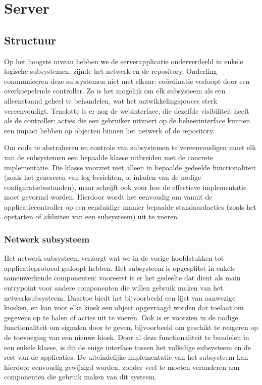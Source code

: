 \part{Server}
\label{server}

\chapter{Structuur}

Op het hoogste niveau hebben we de serverapplicatie onderverdeeld in enkele logische subsystemen, zijnde het netwerk en de repository. Onderling communiceren deze subsystemen niet met elkaar: coördinatie verloopt door een overkoepelende controller. Zo is het mogelijk om elk subsysteem als een alleenstaand geheel te behandelen, wat het ontwikkelingsproces sterk vereenvoudigt. Tenslotte is er nog de webinterface, die dezelfde visibiliteit heeft als de controller: acties die een gebruiker uitvoert op de beheerinterface kunnen een impact hebben op objecten binnen het netwerk of de repository.

Om code te abstraheren en controle van subsystemen te vereenvoudigen moet elk van de subsystemen een bepaalde klasse uitbreiden met de concrete implementatie. Die klasse voorziet niet alleen in bepaalde gedeelde functionaliteit (zoals het genereren van log berichten, of inladen van de nodige configuratiebestanden), maar schrijft ook voor hoe de effectieve implementatie moet gevormd worden. Hierdoor wordt het eenvoudig om vanuit de applicatiecontroller op een eenduidige manier bepaalde standaardacties (zoals het opstarten of afsluiten van een subsysteem) uit te voeren.

\section{Netwerk subsysteem}

Het netwerk subsysteem verzorgt wat we in de vorige hoofdstukken tot applicatieprotocol gedoopt hebben. Het subsysteem is opgesplitst in enkele samenwerkende componenten: vooreerst is er het gedeelte dat dient als main entrypoint voor andere componenten die willen gebruik maken van het netwerksubsysteem. Daartoe biedt het bijvoorbeeld een lijst van aanwezige kiosken, en kan voor elke kiosk een object opgevraagd worden dat toelaat om gegevens op te halen of acties uit te voeren. Ook is er voorzien in de nodige functionaliteit om signalen door te geven, bijvoorbeeld om geschikt te reageren op de toevoeging van een nieuwe kiosk.
Door al deze functionaliteit te bundelen in een enkele klasse, is dit de enige interface tussen het volledige subsysteem en de rest van de applicaties. De uiteindelijke implementatie van het subsysteem kan hierdoor eenvoudig gewijzigd worden, zonder veel te moeten veranderen aan componenten die gebruik maken van dit systeem.

